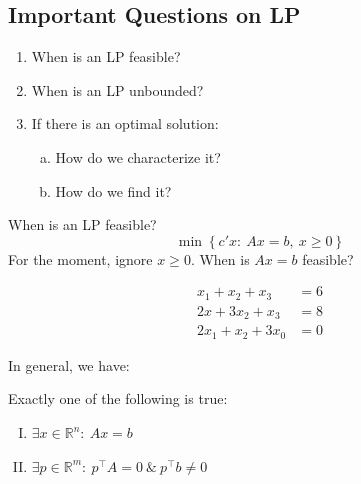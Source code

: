 \documentclass[11pt]{article}
\numberwithin{equation}{section}
\begin{document}
\subsection{Important Questions on LP}
\begin{enumerate}[1)]
    \item When is an LP feasible?
    \item When is an LP unbounded?
    \item If there is an optimal solution:
    \begin{enumerate}[a)]
        \item How do we characterize it?
        \item How do we find it?
    \end{enumerate}
\end{enumerate}
When is an LP feasible?
$$\min \left\{ c'x: \ Ax=b, \ x \geq 0 \right\}$$
    For the moment, ignore $x \geq 0$. When is $Ax=b$ feasible?
    \begin{example}
        \begin{align*}
            x_{1}+x_{2}+x_{3}&=6 \\
            2 x+3 x_{2}+x_{3}&=8 \\
            2 x_{1}+x_{2}+3 x_{0}&=0
        \end{align*}
    \end{example}
    In general, we have:
    \begin{theorem}
        Exactly one of the following is true:
        \begin{enumerate}[I)]
            \item $\exists x \in \mathbb{R}^{n}: \ Ax=b$
            \item $\exists p \in \mathbb{R}^{m}: \ p^\top A=0\ \& \ p^\top b \neq 0$
        \end{enumerate}
    \end{theorem}
\end{document}
